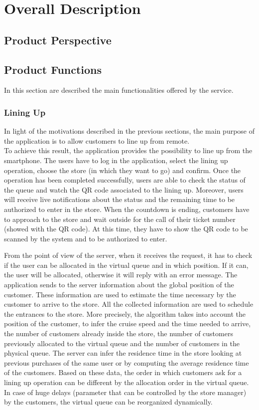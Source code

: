 \chapter{Overall Description}

\section{Product Perspective}

\section{Product Functions}

In this section are described the main functionalities offered by the service.

\subsection{Lining Up}
In light of the motivations described in the previous sections, the main purpose of the application is to allow customers to line up from remote.\\
To achieve this result, the application provides the possibility to line up from the smartphone.
The users have to log in the application, select the lining up operation, choose the store (in which they want to go) and confirm.
Once the operation has been completed successfully, users are able to check the status of the queue and watch the QR code associated to the lining up.
Moreover, users will receive live notifications about the status and the remaining time to be authorized to enter in the store.
When the countdown is ending, customers have to approach to the store and wait outside for the call of their ticket number (showed with the QR code). At this time, they have to show the QR code to be scanned by the system and to be authorized to enter.

From the point of view of the server, when it receives the request, it has to check if the user can be allocated in the virtual queue and in which position. If it can, the user will be allocated, otherwise it will reply with an error message.
The application sends to the server information about the global position of the customer. These information are used to estimate the time necessary by the customer to arrive to the store.
All the collected information are used to schedule the entrances to the store.
More precisely, the algorithm takes into account the position of the customer, to infer the cruise speed and the time needed to arrive, the number of customers already inside the store, the number of customers previously allocated to the virtual queue and the number of customers in the physical queue.
The server can infer the residence time in the store looking at previous purchases of the same user or by computing the average residence time of the customers.
Based on these data, the order in which customers ask for a lining up operation can be different by the allocation order in the virtual queue. In case of huge delays (parameter that can be controlled by the store manager) by the customers, the virtual queue can be reorganized dynamically.

